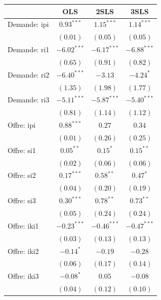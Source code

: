 \documentclass[11pt,]{article}
\begin{document}
\begin{table}
\begin{center}
\begin{tabular}{l c c c }
\hline
 & OLS & 2SLS & 3SLS \\
\hline
Demande: ipi        & $0.93^{***}$  & $1.15^{***}$  & $1.14^{***}$  \\
                    & $(0.01)$      & $(0.05)$      & $(0.05)$      \\
Demande: ri1        & $-6.02^{***}$ & $-6.17^{***}$ & $-6.88^{***}$ \\
                    & $(0.65)$      & $(0.91)$      & $(0.82)$      \\
Demande: ri2        & $-6.40^{***}$ & $-3.13$       & $-4.24^{*}$   \\
                    & $(1.35)$      & $(1.98)$      & $(1.77)$      \\
Demande: ri3        & $-5.11^{***}$ & $-5.87^{***}$ & $-5.40^{***}$ \\
                    & $(0.81)$      & $(1.14)$      & $(1.12)$      \\
Offre: ipi          & $0.88^{***}$  & $0.27$        & $0.34$        \\
                    & $(0.01)$      & $(0.26)$      & $(0.25)$      \\
Offre: si1          & $0.05^{**}$   & $0.15^{*}$    & $0.15^{**}$   \\
                    & $(0.02)$      & $(0.06)$      & $(0.06)$      \\
Offre: si2          & $0.17^{***}$  & $0.58^{**}$   & $0.47^{*}$    \\
                    & $(0.04)$      & $(0.20)$      & $(0.19)$      \\
Offre: si3          & $0.30^{***}$  & $0.78^{**}$   & $0.73^{**}$   \\
                    & $(0.05)$      & $(0.24)$      & $(0.24)$      \\
Offre: iki1         & $-0.23^{***}$ & $-0.46^{***}$ & $-0.47^{***}$ \\
                    & $(0.03)$      & $(0.13)$      & $(0.13)$      \\
Offre: iki2         & $-0.14^{*}$   & $-0.19$       & $-0.28$       \\
                    & $(0.06)$      & $(0.17)$      & $(0.14)$      \\
Offre: iki3         & $-0.08^{*}$   & $0.05$        & $-0.08$       \\
                    & $(0.04)$      & $(0.12)$      & $(0.10)$      \\

\end{tabular}
\end{center}
\end{table}
\end{document}
